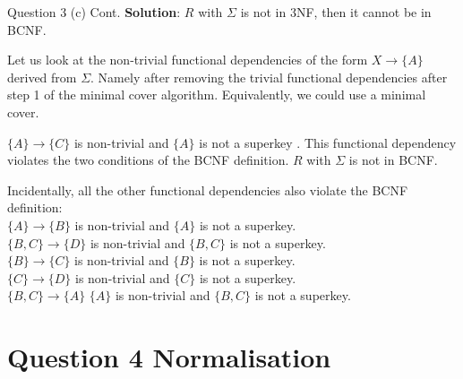 \begin{frame}[fragile]{Question 3 (c) Cont.}
\textbf{Solution}:
$R$ with $\Sigma$ is not in 3NF, then it cannot be in BCNF.\\\vspace{3pt}

Let us look at the non-trivial functional dependencies of the form $X \rightarrow \{A\}$ derived from $\Sigma$. Namely after removing the trivial functional dependencies after step 1 of the minimal cover algorithm. Equivalently, we could use a minimal cover.\\\vspace{3pt}

$\{A\} \rightarrow \{C\}$ is non-trivial and $\{A\}$ is not a superkey . This functional dependency violates the two conditions of the BCNF definition. $R$ with $\Sigma$ is not in BCNF.\\\vspace{3pt}

Incidentally, all the other functional dependencies also violate the BCNF definition:\\
$\{A\} \rightarrow \{B\}$ is non-trivial and $\{A\}$ is not a superkey.\\
$\{B, C\} \rightarrow \{D\}$ is non-trivial and $\{B, C\}$ is not a superkey.\\
$\{B\} \rightarrow \{C\}$ is non-trivial and $\{B\}$ is not a superkey.\\
$\{C\} \rightarrow \{D\}$ is non-trivial and  $\{C\}$ is not a superkey.\\
$\{B, C\} \rightarrow \{A\}$ $\{A\}$ is non-trivial and  $\{B, C\}$ is not a superkey.
\end{frame}

\section*{Question 4 Normalisation}

